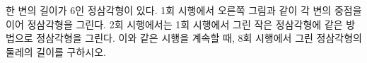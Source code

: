 \noindent\begin{minipage}[t]{0.58\linewidth}\vspace{0pt}\raggedright 한 변의 길이가 $6$인 정삼각형이 있다. 1회 시행에서 오른쪽 그림과 같이 각 변의 중점을 이어 정삼각형을 그린다. 2회 시행에서는 1회 시행에서 그린 작은 정삼각형에 같은 방법으로 정삼각형을 그린다. 이와 같은 시행을 계속할 때, 8회 시행에서 그린 정삼각형의 둘레의 길이를 구하시오.\end{minipage}\hfill\begin{minipage}[t]{0.4\linewidth}\vspace{0pt}\centering \resizebox{\ifdim\width>\linewidth\linewidth\else\width\fi}{!}{}\end{minipage}\par
